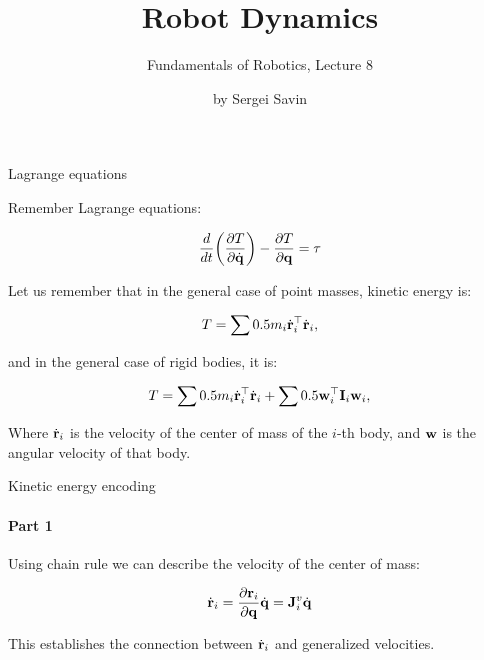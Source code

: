 \documentclass{beamer}
\title{Robot Dynamics}
\subtitle{Fundamentals of Robotics, Lecture 8}
\author{by Sergei Savin}
\date{\mydate}
\begin{document}
\maketitle




\begin{frame}{Lagrange equations}
	\begin{flushleft}
		
		Remember Lagrange equations:
		
		\begin{equation}
			\label{eq:Lagrange}
			\frac{d}{dt} \bigg( 
			\frac{\partial T }{\partial \dot{\mathbf{q}}}
			\bigg) - 
			\frac{\partial T }{\partial \mathbf{q}} = \tau
		\end{equation}
		
		Let us remember that in the general case of point masses, kinetic energy is:
		
		\begin{equation}
			\label{eq:kinetic_energy}
			T = \sum 0.5 m_i \dot{\mathbf{r}}_i^\top \dot{\mathbf{r}}_i,
		\end{equation}
		
		and in the general case of rigid bodies, it is:
		
		\begin{equation}
			\label{eq:kinetic_energy_rigid_body}
			T = \sum 0.5 m_i \dot{\mathbf{r}}_i^\top \dot{\mathbf{r}}_i + \sum 0.5 \mathbf{w}_i^\top \mathbf{I}_i \mathbf{w}_i,
		\end{equation}
		
		Where $\dot{\mathbf{r}}_i$ is the velocity of the center of mass of the $i$-th body, and $\mathbf{w}$ is the angular velocity of that body.
		
	\end{flushleft}
\end{frame}




\begin{frame}{Kinetic energy encoding}
	\framesubtitle{Part 1}
	\begin{flushleft}
		
		Using chain rule we can describe the velocity of the center of mass:
		
		\begin{equation}
			\dot{\mathbf{r}}_i = \frac{\partial \mathbf{r}_i }{\partial {\mathbf{q}}} \dot{\mathbf{q}} = \mathbf{J}^v_i \dot{\mathbf{q}}
		\end{equation}
		
		This establishes the connection between $\dot{\mathbf{r}}_i$ and generalized velocities.
		
	\end{flushleft}
\end{frame}
\end{document}

